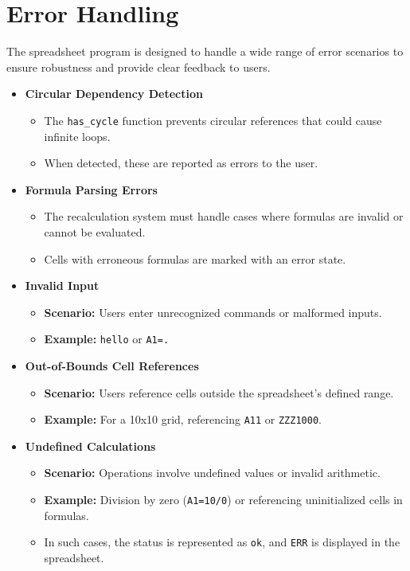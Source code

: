 \documentclass{article}
\begin{document}
\section{Error Handling}
The spreadsheet program is designed to handle a wide range of error scenarios to ensure robustness and provide clear feedback to users.

\begin{itemize}
    \item \textbf{Circular Dependency Detection}
    \begin{itemize}
        \item The \texttt{has\_cycle} function prevents circular references that could cause infinite loops.
        \item When detected, these are reported as errors to the user.
    \end{itemize}
    
    \item \textbf{Formula Parsing Errors}
    \begin{itemize}
        \item The recalculation system must handle cases where formulas are invalid or cannot be evaluated.
        \item Cells with erroneous formulas are marked with an error state.
    \end{itemize}

    \item \textbf{Invalid Input}
    \begin{itemize}
        \item \textbf{Scenario:} Users enter unrecognized commands or malformed inputs.
        \item \textbf{Example:} \texttt{hello} or \texttt{A1=.}
    \end{itemize}

    \item \textbf{Out-of-Bounds Cell References}
    \begin{itemize}
        \item \textbf{Scenario:} Users reference cells outside the spreadsheet's defined range.
        \item \textbf{Example:} For a 10x10 grid, referencing \texttt{A11} or \texttt{ZZZ1000}.
    \end{itemize}

    \item \textbf{Undefined Calculations}
    \begin{itemize}
        \item \textbf{Scenario:} Operations involve undefined values or invalid arithmetic.
        \item \textbf{Example:} Division by zero (\texttt{A1=10/0}) or referencing uninitialized cells in formulas.
        \item In such cases, the status is represented as \texttt{ok}, and \texttt{ERR} is displayed in the spreadsheet.
    \end{itemize}


\end{itemize}
\end{document}
